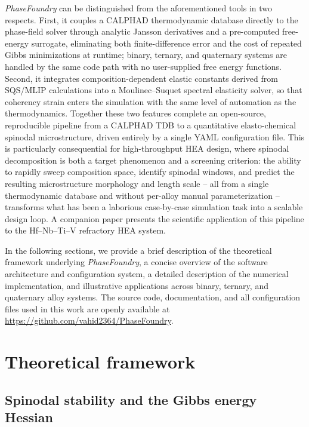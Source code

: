 \documentclass[12pt]{article}
\begin{document}
\textit{PhaseFoundry} can be distinguished from the aforementioned tools in two respects. First, it couples a CALPHAD thermodynamic database directly to the phase-field solver through analytic Jansson derivatives\cite{kunselman2024analytically} and a pre-computed free-energy surrogate, eliminating both finite-difference error and the cost of repeated Gibbs minimizations at runtime; binary, ternary, and quaternary systems are handled by the same code path with no user-supplied free energy functions. Second, it integrates composition-dependent elastic constants derived from SQS/MLIP calculations\cite{zunger1990special} into a Moulinec--Suquet spectral elasticity solver,\cite{moulinec1998numerical} so that coherency strain enters the simulation with the same level of automation as the thermodynamics. Together these two features complete an open-source, reproducible pipeline from a CALPHAD TDB to a quantitative elasto-chemical spinodal microstructure, driven entirely by a single YAML configuration file. This is particularly consequential for high-throughput HEA design, where spinodal decomposition is both a target phenomenon and a screening criterion: the ability to rapidly sweep composition space, identify spinodal windows, and predict the resulting microstructure morphology and length scale -- all from a single thermodynamic database and without per-alloy manual parameterization -- transforms what has been a laborious case-by-case simulation task into a scalable design loop. A companion paper\cite{kunselman2025spinodal} presents the scientific application of this pipeline to the Hf--Nb--Ti--V refractory HEA system.

In the following sections, we provide a brief description of the theoretical framework underlying \textit{PhaseFoundry}, a concise overview of the software architecture and configuration system, a detailed description of the numerical implementation, and illustrative applications across binary, ternary, and quaternary alloy systems. The source code, documentation, and all configuration files used in this work are openly available at \url{https://github.com/vahid2364/PhaseFoundry}.

\section{Theoretical framework}

\subsection{Spinodal stability and the Gibbs energy Hessian}
\end{document}

